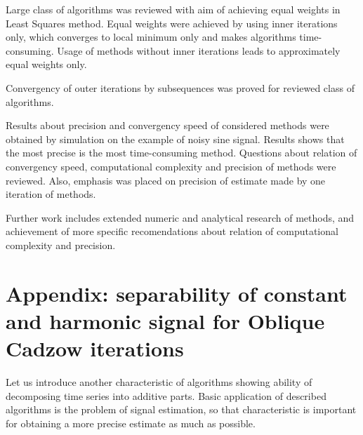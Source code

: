 \documentclass[12pt,a4paper,fleqn,leqno]{article}
\begin{document}
Large class of algorithms was reviewed with aim of achieving equal weights in Least Squares method. Equal weights were achieved by using inner iterations only, which converges to local minimum only and makes algorithms time-consuming. Usage of methods without inner iterations leads to approximately equal weights only.

Convergency of outer iterations by subsequences was proved for reviewed class of algorithms.

Results about precision and convergency speed of considered methods were obtained by simulation on the example of noisy sine signal. Results shows that the most precise is the most time-consuming method. Questions about relation of convergency speed, computational complexity and precision of methods were reviewed. Also, emphasis was placed on precision of estimate made by one iteration of methods.

Further work includes extended numeric and analytical research of methods, and achievement of more specific recomendations about relation of computational complexity and precision.

%



\section{Appendix: separability of constant and harmonic signal for Oblique Cadzow iterations}
\label{sec:app}

Let us introduce another characteristic of algorithms showing ability of decomposing time series into additive parts. Basic application of described algorithms is the problem of signal estimation, so that characteristic is important for obtaining a more precise estimate as much as possible.
\end{document}
